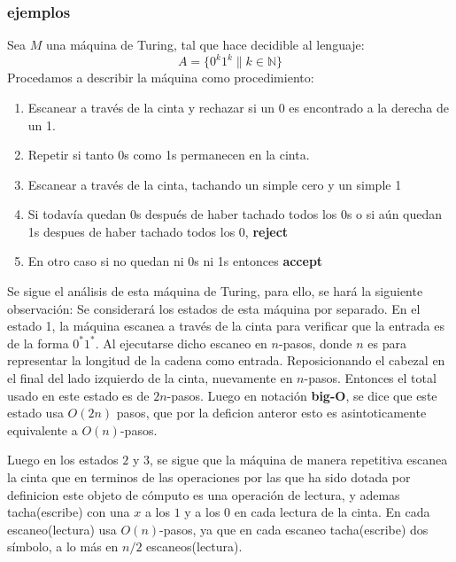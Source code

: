 \documentclass[10pt]{report}
\begin{document}
    \subsubsection{ejemplos}
    Sea $M$ una máquina de Turing, tal que hace decidible al lenguaje:
    \begin{equation}
        A = \{0^{k}1^{k} \| k\in \mathbb{N} \}\label{eq:equation12}
    \end{equation}
    Procedamos a describir la máquina como procedimiento:
    \begin{enumerate}
        \item Escanear a través de la cinta y rechazar si un 0 es encontrado a la derecha de un 1.
        \item Repetir si tanto 0s como 1s permanecen en la cinta.
        \item Escanear a través de la cinta, tachando un simple cero y un simple 1
        \item Si todavía quedan 0s después de haber tachado todos los 0s o si aún quedan 1s despues de haber tachado todos los 0, \textbf{reject}
        \item En otro caso si no quedan ni 0s ni 1s entonces \textbf{accept}
    \end{enumerate}
    \hfil
    Se sigue el análisis de esta máquina de Turing, para ello, se hará la siguiente observación:
    \newline
    Se considerará los estados de esta máquina por separado.
    En el estado 1, la máquina escanea a través de la cinta para verificar que la entrada es de la forma $0^{*}1^{*}$.
    Al ejecutarse dicho escaneo en $n$-pasos, donde $n$ es para representar la longitud de la cadena como entrada.
    Reposicionando el cabezal en el final del lado izquierdo de la cinta, nuevamente en $n$-pasos.
    Entonces el total usado en este estado es de $2n$-pasos.
    Luego en notación \textbf{big-O}, se dice que este estado usa $O(2n)$ pasos, que por la deficion anteror esto es
    asintoticamente equivalente a $O(n)$-pasos.\newline

    Luego en los estados $2$ y $3$, se sigue que la máquina de manera repetitiva escanea la cinta que en terminos
    de las operaciones por las que ha sido dotada por definicion este objeto de cómputo es una operación de lectura,
    y ademas tacha(escribe) con una $x$ a los $1$ y a los $0$ en cada lectura de la cinta.
    En cada escaneo(lectura) usa $O(n)$-pasos, ya que en cada escaneo tacha(escribe) dos símbolo, a lo más en $n/2$ escaneos(lectura).\newline
\end{document}
